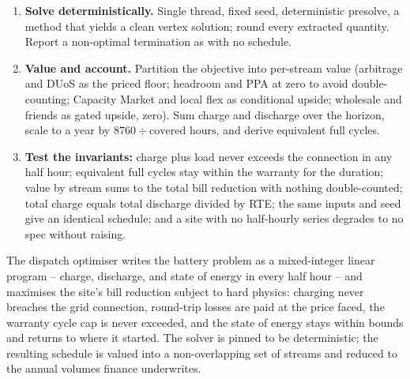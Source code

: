 \begin{rebuild}
\begin{enumerate}
  \item \textbf{Solve deterministically.} Single thread, fixed seed, deterministic presolve, a method that yields a clean vertex solution; round every extracted quantity. Report a non-optimal termination as  with no schedule.
  \item \textbf{Value and account.} Partition the objective into per-stream value (arbitrage and DUoS as the priced floor; headroom and PPA at zero to avoid double-counting; Capacity Market and local flex as conditional upside; wholesale and friends as gated upside, zero). Sum charge and discharge over the horizon, scale to a year by $8760 \div \text{covered hours}$, and derive equivalent full cycles.
  \item \textbf{Test the invariants:} charge plus load never exceeds the connection in any half hour; equivalent full cycles stay within the warranty for the duration; value by stream sums to the total bill reduction with nothing double-counted; total charge equals total discharge divided by RTE; the same inputs and seed give an identical schedule; and a site with no half-hourly series degrades to no spec without raising.
\end{enumerate}
\end{rebuild}

\begin{keyidea}
The dispatch optimiser writes the battery problem as a mixed-integer linear program -- charge, discharge, and state of energy in every half hour -- and maximises the site's bill reduction subject to hard physics: charging never breaches the grid connection, round-trip losses are paid at the price faced, the warranty cycle cap is never exceeded, and the state of energy stays within bounds and returns to where it started. The solver is pinned to be deterministic; the resulting schedule is valued into a non-overlapping set of streams and reduced to the annual volumes finance underwrites.
\end{keyidea}
